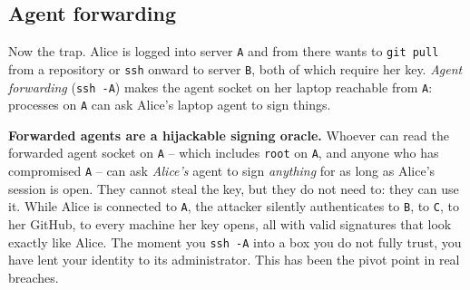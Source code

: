 \subsection{Agent forwarding}

Now the trap. Alice is logged into server \texttt{A} and from there wants to \texttt{git pull} from a repository or \texttt{ssh} onward to server \texttt{B}, both of which require her key. \emph{Agent forwarding} (\texttt{ssh -A}) makes the agent socket on her laptop reachable from \texttt{A}: processes on \texttt{A} can ask Alice's laptop agent to sign things.

\begin{center}
\end{center}

\begin{attackbox}
\textbf{Forwarded agents are a hijackable signing oracle.} Whoever can read the forwarded agent socket on \texttt{A} -- which includes \texttt{root} on \texttt{A}, and anyone who has compromised \texttt{A} -- can ask \emph{Alice's} agent to sign \emph{anything} for as long as Alice's session is open. They cannot steal the key, but they do not need to: they can use it. While Alice is connected to \texttt{A}, the attacker silently authenticates to \texttt{B}, to \texttt{C}, to her GitHub, to every machine her key opens, all with valid signatures that look exactly like Alice. The moment you \texttt{ssh -A} into a box you do not fully trust, you have lent your identity to its administrator. This has been the pivot point in real breaches.
\end{attackbox}

